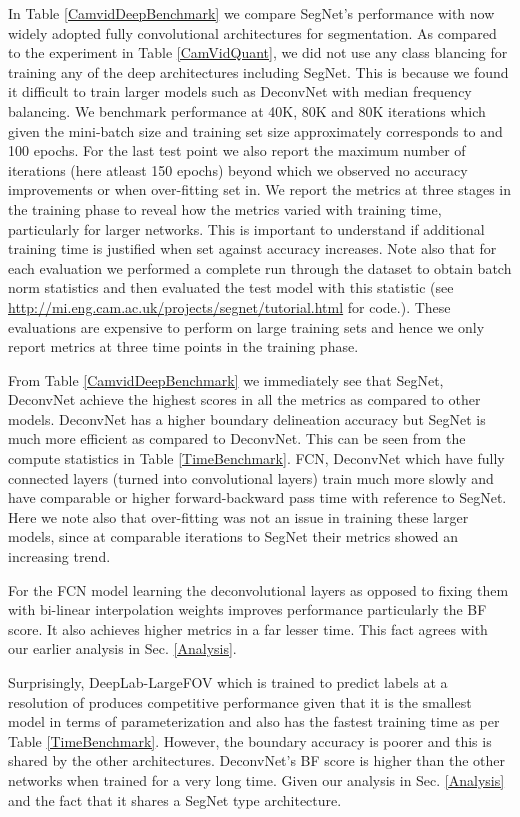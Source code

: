 \documentclass[10pt,journal,compsoc]{IEEEtran}
\begin{document}
In Table \ref{CamvidDeepBenchmark} we compare SegNet's performance with now widely adopted fully convolutional architectures for segmentation. As compared to the experiment in Table \ref{CamVidQuant}, we did not use any class blancing for training any of the deep architectures including SegNet. This is because we found it difficult to train larger models such as DeconvNet with median frequency balancing. We benchmark performance at 40K, 80K and 80K iterations which given the mini-batch size and training set size approximately corresponds to  and 100 epochs. For the last test point we also report the maximum number of iterations (here atleast 150 epochs) beyond which we observed no accuracy improvements or when over-fitting set in. We report the metrics at three stages in the training phase to reveal how the metrics varied with training time, particularly for larger networks. This is important to understand if additional training time is justified when set against accuracy increases. Note also that for each evaluation we performed a complete run through the dataset to obtain batch norm statistics and then evaluated the test model with this statistic (see \url{http://mi.eng.cam.ac.uk/projects/segnet/tutorial.html} for code.). These evaluations are expensive to perform on large training sets and hence we only report metrics at three time points in the training phase. 

From Table \ref{CamvidDeepBenchmark} we immediately see that SegNet, DeconvNet achieve the highest scores in all the metrics as compared to other models. DeconvNet has a higher boundary delineation accuracy but  SegNet is much more efficient as compared to DeconvNet. This can be seen from the compute statistics in Table \ref{TimeBenchmark}. FCN, DeconvNet which have  fully connected layers (turned into convolutional layers) train much more slowly and have comparable or higher forward-backward pass time with reference to SegNet. Here we note also that over-fitting was not an issue in training these larger models, since at comparable iterations to SegNet their metrics showed an increasing trend. 

For the FCN model learning the deconvolutional layers as opposed to fixing them with bi-linear interpolation weights improves performance particularly the BF score. It also achieves higher metrics in a far lesser time. This fact agrees with our earlier analysis in Sec. \ref{Analysis}. 

Surprisingly, DeepLab-LargeFOV which is trained to predict labels at a resolution of  produces competitive performance given that it is the smallest model in terms of parameterization and also has the fastest training time as per Table \ref{TimeBenchmark}. However, the boundary accuracy is poorer and this is shared by the other architectures. DeconvNet's BF score is higher than the other networks when trained for a very long time. Given our analysis in Sec. \ref{Analysis} and the fact that it shares a SegNet type architecture. 
\end{document}

